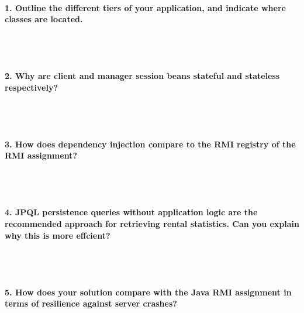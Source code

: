 \documentclass{ds-report}
\begin{document}
	\maketitle

	\paragraph{1. Outline the different tiers of your application, and indicate where classes are located.} \mbox{}\\\\




	
	\paragraph{2. Why are client and manager session beans stateful and stateless respectively?} \mbox{}\\\\




	\paragraph{3. How does dependency injection compare to the RMI registry of the RMI assignment?} \mbox{}\\\\




	\paragraph{4. JPQL persistence queries without application logic are the recommended approach for retrieving rental statistics. Can you explain why this is more effcient?} \mbox{}\\\\





	\paragraph{5. How does your solution compare with the Java RMI assignment in terms of resilience against server crashes?} \mbox{}\\\\
\end{document}
